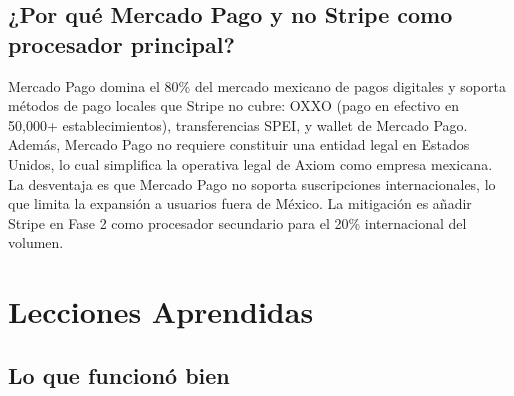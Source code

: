\section{¿Por qué Mercado Pago y no Stripe como procesador principal?}
Mercado Pago domina el 80\% del mercado mexicano de pagos digitales y soporta métodos de pago locales que Stripe no cubre: OXXO (pago en efectivo en 50,000+ establecimientos), transferencias SPEI, y wallet de Mercado Pago. Además, Mercado Pago no requiere constituir una entidad legal en Estados Unidos, lo cual simplifica la operativa legal de Axiom como empresa mexicana. La desventaja es que Mercado Pago no soporta suscripciones internacionales, lo que limita la expansión a usuarios fuera de México. La mitigación es añadir Stripe en Fase 2 como procesador secundario para el 20\% internacional del volumen.

\chapter{Lecciones Aprendidas}
\label{app:lessons-learned}

\section{Lo que funcionó bien}

